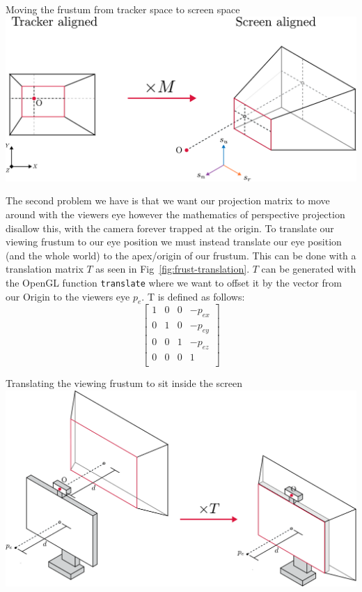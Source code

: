 \begin{figureBox}[label={fig:basis-change}, width=0.8\linewidth]{Moving the frustum from tracker space to screen space}
    \includegraphics[width = 0.8\linewidth]{./background/figures/projection/realignment.pdf}
\end{figureBox}

The second problem we have is that we want our projection matrix to move around with the viewers eye however the mathematics of perspective projection disallow this, with the camera forever trapped at the origin. To translate our viewing frustum to our eye position we must instead translate our eye position (and the whole world) to the apex/origin of our frustum. This can be done with a translation matrix $T$ as seen in Fig~\ref{fig:frust-translation}. $T$ can be generated with the OpenGL function \texttt{translate} where we want to offset it by the vector from our Origin to the viewers eye $p_e$. T is defined as follows:
\[
    \begin{bmatrix}
        1 & 0 & 0 & -p_{ex} \\
        0 & 1 & 0 & -p_{ey} \\
        0 & 0 & 1 & -p_{ez} \\
        0 & 0 & 0 & 1       \\
    \end{bmatrix}
\]

\begin{figureBox}[label={fig:frust-translation}, width=0.8\linewidth]{Translating the viewing frustum to sit inside the screen}
    \includegraphics[width = 0.8\linewidth]{./background/figures/projection/frust-translation.pdf}
\end{figureBox}

